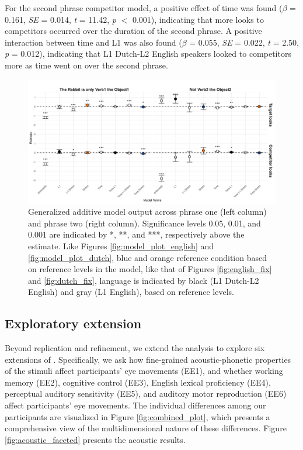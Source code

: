 For the second phrase competitor model, a positive effect of time was found ($\beta$ = 0.161, \textit{SE} = 0.014, \textit{t} = 11.42, \textit{p} $<$ 0.001), indicating that more looks to competitors occurred over the duration of the second phrase. A positive interaction between time and L1 was also found ($\beta$ = 0.055, \textit{SE} = 0.022, \textit{t} = 2.50, \textit{p} = 0.012), indicating that L1 Dutch-L2 English speakers looked to competitors more as time went on over the second phrase. 

\begin{figure}[H]  %
    \centering
    \includegraphics[width=\textwidth,height=\textheight,keepaspectratio]{viz/gam_mod_out.png}
    \caption{Generalized additive model output across phrase one (left column) and phrase two (right column). Significance levels 0.05, 0.01, and 0.001 are indicated by *, **, and ***, respectively above the estimate. Like Figures \ref{fig:model_plot_english} and \ref{fig:model_plot_dutch}, blue and orange reference condition based on reference levels in the model, like that of Figures \ref{fig:english_fix} and \ref{fig:dutch_fix}, language is indicated by black (L1 Dutch-L2 English) and gray (L1 English), based on reference levels.}
    \label{fig:gam_mod_out}
\end{figure}

\subsection{Exploratory extension}

Beyond replication and refinement, we extend the analysis to explore six extensions of \cite{ge2021a}. Specifically, we ask how fine-grained acoustic-phonetic properties of the stimuli affect participants' eye movements (EE1), and whether working memory (EE2), cognitive control (EE3), English lexical proficiency (EE4), perceptual auditory sensitivity (EE5), and auditory motor reproduction (EE6) affect participants' eye movements. The individual differences among our participants are visualized in Figure \ref{fig:combined_plot}, which presents a comprehensive view of the multidimensional nature of these differences. Figure \ref{fig:acoustic_faceted} presents the acoustic results.


